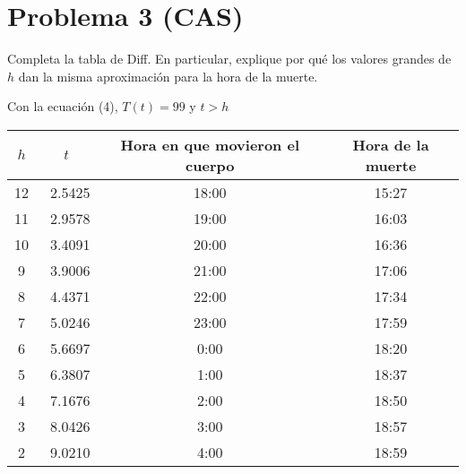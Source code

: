 \section*{Problema 3 (CAS)}
Completa la tabla de Diff. En particular, explique por qué los valores grandes de $h$ dan la misma aproximación para la hora de la muerte.

\begin{center}
    Con la ecuación (4), $T(t) = 99$ y $t > h$\\ 
    \vspace{10pt}
    \begin{tabular}{ |c|c|c|c| } 
        \hline
        $h$ & $t$ & Hora en que movieron el cuerpo & Hora de la muerte \\ 
        \hline
        12 & ~2.5425 & 18:00 & 15:27\\
        \hline
        11 & ~2.9578 & 19:00 & 16:03\\
        \hline
        10 & ~3.4091 & 20:00 & 16:36\\
        \hline
        9 & ~3.9006 & 21:00 & 17:06\\
        \hline
        8 & ~4.4371 & 22:00 & 17:34\\
        \hline
        7 & ~5.0246 & 23:00 & 17:59\\
        \hline
        6 & ~5.6697 & 0:00 & 18:20\\
        \hline
        5 & ~6.3807 & 1:00 & 18:37\\
        \hline
        4 & ~7.1676 & 2:00 & 18:50\\
        \hline
        3 & ~8.0426 & 3:00 & 18:57\\
        \hline
        2 & ~9.0210 & 4:00 & 18:59\\
        \hline
    \end{tabular}
\end{center} 
